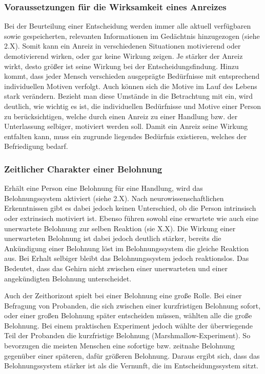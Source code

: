 \subsubsection{Voraussetzungen für die Wirksamkeit eines Anreizes}
Bei der Beurteilung einer Entscheidung werden immer alle aktuell verfügbaren sowie gespeicherten, relevanten Informationen im Gedächtnis hinzugezogen (siehe 2.X). Somit kann ein Anreiz in verschiedenen Situationen motivierend oder demotivierend wirken, oder gar keine Wirkung zeigen. Je stärker der Anreiz wirkt, desto größer ist seine Wirkung bei der Entscheidungsfindung. Hinzu kommt, dass jeder Mensch verschieden ausgeprägte Bedürfnisse mit entsprechend individuellen Motiven verfolgt. Auch können sich die Motive im Lauf des Lebens stark verändern. \citep[S. 70]{Nowka.2013}
Bezieht man diese Umstände in die Betrachtung mit ein, wird deutlich, wie wichtig es ist, die individuellen Bedürfnisse und Motive einer Person zu berücksichtigen, welche durch einen Anreiz zu einer Handlung bzw. der Unterlassung selbiger, motiviert werden soll. Damit ein Anreiz seine Wirkung entfalten kann, muss ein zugrunde liegendes Bedürfnis existieren, welches der Befriedigung bedarf. \citep[S. 78]{Nowka.2013}

\subsubsection{Zeitlicher Charakter einer Belohnung}
Erhält eine Person eine Belohnung für eine Handlung, wird das Belohnungssystem aktiviert (siehe 2.X). Nach neurowissenschaftlichen Erkenntnissen gibt es dabei jedoch keinen Unterschied, ob die Person intrinsisch oder extrinsisch motiviert ist. \citep[S. 71]{Nowka.2013}
Ebenso führen sowohl eine erwartete wie auch eine unerwartete Belohnung zur selben Reaktion (sie X.X). Die Wirkung einer unerwarteten Belohnung ist dabei jedoch deutlich stärker,  bereits die Ankündigung einer Belohnung löst im Belohnungssystem die gleiche Reaktion aus. Bei Erhalt selbiger bleibt das Belohnungssystem jedoch reaktionslos. Das Bedeutet, dass das Gehirn nicht zwischen einer unerwarteten und einer angekündigten Belohnung unterscheidet. \citep[S. 71f]{Nowka.2013}
 
Auch der Zeithorizont spielt bei einer Belohnung eine große Rolle. Bei einer Befragung von Probanden, die sich zwischen einer kurzfristigen Belohnung sofort, oder einer großen Belohnung später entscheiden müssen, wählten alle die große Belohnung. Bei einem praktischen Experiment jedoch wählte der überwiegende Teil der Probanden die kurzfristige Belohnung (Marshmallow-Experiment). So bevorzugen die meisten Menschen eine sofortige bzw. zeitnahe Belohnung gegenüber einer späteren, dafür größeren Belohnung. Daraus ergibt sich, dass das Belohnungssystem stärker ist als die Vernunft, die im Entscheidungssystem sitzt. \citep[S. 19]{Seelbach.2011}

